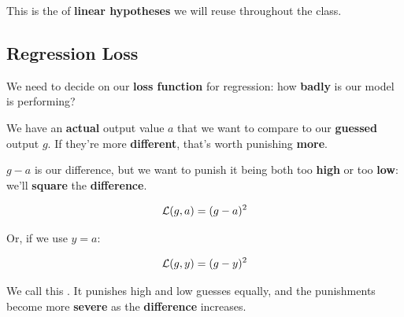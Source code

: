         This is the  of \textbf{linear hypotheses} we will reuse throughout the class.
        
    \subsection{Regression Loss}
    
        We need to decide on our \textbf{loss function} for regression: how \textbf{badly} is our model is performing?
        
        We have an \textbf{actual} output value $a$ that we want to compare to our \textbf{guessed} output $g$. If they're more \textbf{different}, that's worth punishing \textbf{more}. 
        
        $g-a$ is our difference, but we want to punish it being both too \textbf{high} or too \textbf{low}: we'll \textbf{square} the \textbf{difference}.
        
        \begin{equation}
            \mathcal{L}(g,a) = (g-a)^2
        \end{equation}
        
        Or, if we use $y=a$:
        
        \begin{equation}
            \mathcal{L}(g,y) = (g-y)^2
        \end{equation}
        
        We call this . It punishes high and low guesses equally, and the punishments become more \textbf{severe} as the \textbf{difference} increases.
        \\

